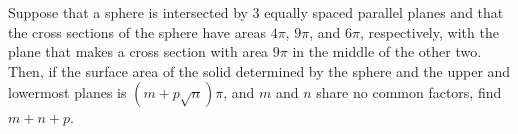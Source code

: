 Suppose that a sphere is intersected by $3$ equally spaced parallel planes and that the cross sections of the sphere have areas $4\pi$, $9\pi$, and $6\pi$, respectively, with the plane that makes a cross section with area $9\pi$ in the middle of the other two. Then, if the surface area of the solid determined  by the sphere and the upper and lowermost planes is $(m+p\sqrt{n})\pi$, and $m$ and $n$ share no common factors, find $m + n + p$.
